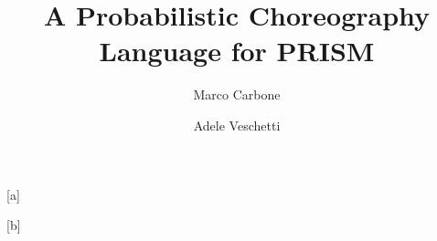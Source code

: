 \documentclass{lmcs} %
\theoremstyle{plain}\newtheorem{satz}[thm]{Satz} %
\def\eg{{\em e.g.}}
\begin{document}
\title[A Probabilistic Choreography Language for PRISM]
{A Probabilistic Choreography Language for PRISM}

\author[M.~Carbone]{Marco Carbone}[a]
\author[A.~Veschetti]{Adele Veschetti}[b]

\address{Computer Science Department, IT University of Copenhagen, Rued Langgaards Vej 7, 2300 Copenhagen S, Denmark}	%

\address{Department of Computer Science, TU Darmstadt, Hochschulstraße 10, 64289 Darmstadt, Germany} %




\end{document}
